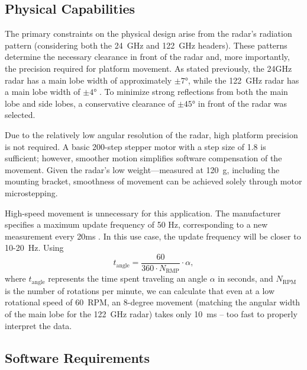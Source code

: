 \subsection{Physical Capabilities}

The primary constraints on the physical design arise from the radar’s radiation pattern (considering both the 24~GHz and 122~GHz headers).
These patterns determine the necessary clearance in front of the radar and, more importantly, the precision required for platform movement.
As stated previously, the 24GHz radar has a main lobe width of approximately $\pm7\text{°}$, while the 122~GHz radar has a main lobe width of $\pm4\text{°}$ \cite{sidarTRX122}.
To minimize strong reflections from both the main lobe and side lobes, a conservative clearance of $\pm45\text{°}$ in front of the radar was selected.

Due to the relatively low angular resolution of the radar, high platform precision is not required.
A basic 200-step stepper motor with a step size of 1.8 is sufficient; however, smoother motion simplifies software compensation of the movement.
Given the radar’s low weight—measured at 120~g, including the mounting bracket, smoothness of movement can be achieved solely through motor microstepping.

High-speed movement is unnecessary for this application.
The manufacturer specifies a maximum update frequency of 50 Hz, corresponding to a new measurement every 20ms \cite{sidarMAN}.
In this use case, the update frequency will be closer to 10-20~Hz.
Using
%
\begin{equation}
  t_{\mathrm{angle}} = \frac{60}{360\cdot N_{\mathrm{RMP}}} \cdot  \alpha,
  \label{eq:poll}
\end{equation}
%
where $t_{\mathrm{angle}}$ represents the time spent traveling an angle $\alpha$ in seconds, and $N_{\mathrm{RPM}}$ is the number of rotations per minute, we can calculate that even at a low rotational speed of 60~RPM, an 8-degree movement (matching the angular width of the main lobe for the 122~GHz radar) takes only 10~ms -- too fast to properly interpret the data.


\subsection{Software Requirements}


